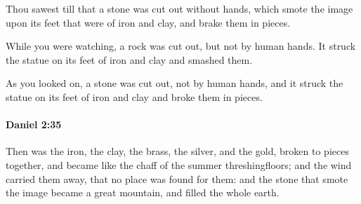 			\begin{versebox}
					\item[BHS] 
					\item[LXX] 
					\item[ASV] Thou sawest till that a stone was cut out without hands, which smote the image upon its feet that were of iron and clay, and brake them in pieces.
					\item[NIV] While you were watching, a rock was cut out, but not by human hands. It struck the statue on its feet of iron and clay and smashed them.
					\item[NRSV] As you looked on, a stone was cut out, not by human hands, and it struck the statue on its feet of iron and clay and broke them in pieces.
			\end{versebox}

		\paragraph{Daniel 2:35} %
			\label{DANIEL-2-35}

			Then was the iron, the clay, the brass, the silver, and the gold, broken to pieces together, and became like the chaff of the summer threshingfloors; and the wind carried them away, that no place was found for them: and the stone that smote the image became a great mountain, and filled the whole earth.

